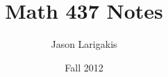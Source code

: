 \documentclass[titlepage,twoside]{article}
\title{Math 437 Notes}
\author{Jason Larigakis}
\date{Fall 2012}
\begin{document}
\maketitle{}

\end{document}
